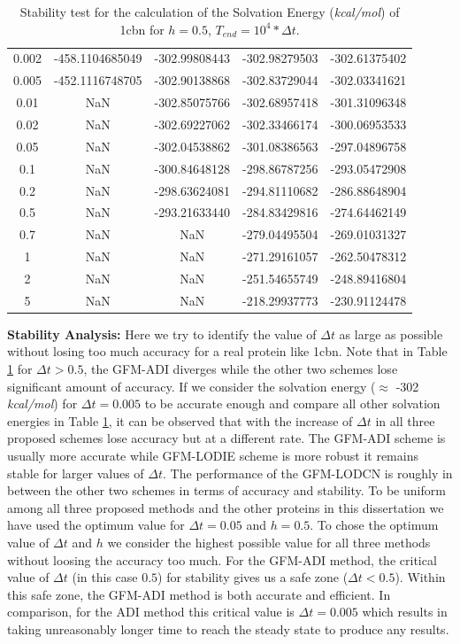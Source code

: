 \begin{table}[!ht]
\begin{tabular}{c c c c c }
0.002 & -458.1104685049 & -302.99808443  & -302.98279503   & -302.61375402 \\
0.005 & -452.1116748705 & -302.90138868  & -302.83729044   & -302.03341621   \\
0.01  &    NaN         & -302.85075766   & -302.68957418   & -301.31096348   \\
0.02  &    NaN         & -302.69227062   & -302.33466174   & -300.06953533   \\
0.05  &    NaN          & -302.04538862   & -301.08386563   & -297.04896758   \\
0.1   &    NaN          & -300.84648128   & -298.86787256   & -293.05472908   \\
0.2   &    NaN           & -298.63624081   & -294.81110682   & -286.88648904   \\
0.5   &    NaN          & -293.21633440   & -284.83429816   & -274.64462149   \\
0.7   &   NaN           & NaN             & -279.04495504   & -269.01031327   \\
1     &     NaN         & NaN             & -271.29161057   & -262.50478312   \\
2     &    NaN          & NaN             & -251.54655749   & -248.89416804   \\
5     &    NaN           & NaN             & -218.29937773   & -230.91124478 \\ \hline
\end{tabular}
\caption{Stability test for the calculation of the Solvation Energy ({\it kcal/mol}) of 1cbn for $h=0.5$, $T_{end} = 10^4*\Delta t$.}
\label{tab-1cbn}
\end{table}

{\bf Stability Analysis:} Here we try to identify the value of $\Delta t$ as large as possible without losing too much accuracy for a real protein like 1cbn. Note that in Table \ref{tab-1cbn} for $\Delta t > 0.5$, the GFM-ADI diverges while the other two schemes lose significant amount of accuracy. If we consider the solvation energy ($\approx $ -302 {\it kcal/mol}) for $\Delta t =0.005$ to be accurate enough and compare all other solvation energies in Table \ref{tab-1cbn}, it can be observed that with the increase of $\Delta t$ in all three proposed schemes lose accuracy but at a different rate. The GFM-ADI scheme is usually more accurate while GFM-LODIE scheme is more robust it remains stable for larger values of $\Delta t$. The performance of the GFM-LODCN is roughly in between the other two schemes in terms of accuracy and stability. To be uniform  among all three proposed methods and the other proteins in this dissertation we have used the optimum value for $\Delta t =0.05$ and $h=0.5$. To chose the optimum value of $\Delta t$ and $h$ we consider the highest possible value for all three methods without loosing the accuracy too much. For the GFM-ADI method, the critical value of $\Delta t$ (in this case $0.5$) for stability gives us a safe zone ($\Delta t < 0.5$). Within this safe zone, the GFM-ADI method is both accurate and efficient. In comparison, for the ADI method this critical value is $\Delta t = 0.005$ which results in taking unreasonably longer time to reach the steady state to produce any results. 


